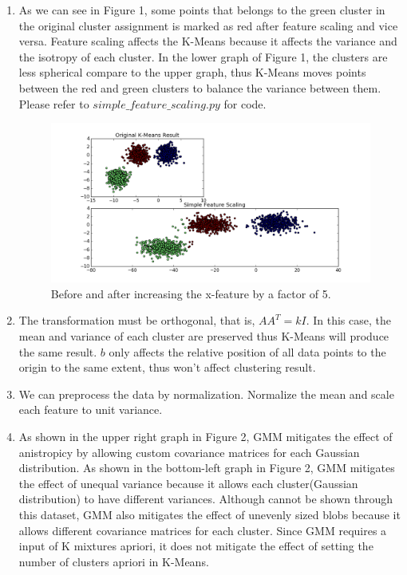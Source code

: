 \documentclass{article}
\begin{document}
\begin{enumerate}
\begin{enumerate}
\begin{itemize}
        \end{itemize}
    \item
        As we can see in Figure 1, some points that belongs to the green cluster in the original cluster assignment is marked as red after feature scaling and vice versa. Feature scaling affects the K-Means because it affects the variance and the isotropy of each cluster. In the lower graph of Figure 1, the clusters are less spherical compare to the upper graph, thus K-Means moves points between the red and green clusters to balance the variance between them. Please refer to $simple\_feature\_scaling.py$ for code.
        \begin{figure}[h]
            \includegraphics[width=.8\linewidth]{figure_1.png}
            \caption{Before and after increasing the x-feature by a factor of 5.}
            \label{fig:graph1}
        \end{figure}
    \item
        The transformation must be orthogonal, that is, $AA^T = kI$. In this case, the mean and variance of each cluster are preserved thus K-Means will produce the same result. $b$ only affects the relative position of all data points to the origin to the same extent, thus won't affect clustering result.
    \item
        We can preprocess the data by normalization. Normalize the mean and scale each feature to unit variance.
    \item
        As shown in the upper right graph in Figure 2, GMM mitigates the effect of anistropicy by allowing custom covariance matrices for each Gaussian distribution. As shown in the bottom-left graph in Figure 2, GMM mitigates the effect of unequal variance because it allows each cluster(Gaussian distribution) to have different variances. Although cannot be shown through this dataset, GMM also mitigates the effect of unevenly sized blobs because it allows different covariance matrices for each cluster. Since GMM requires a input of K mixtures apriori, it does not mitigate the effect of setting the number of clusters apriori in K-Means.

\end{enumerate}
\end{enumerate}
\end{document}
